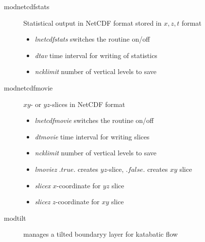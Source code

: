 \documentclass[a4paper,10pt]{article}
\begin{document}
\begin{description}
\begin{itemize}
\end{itemize}
\item [modnetcdfstats] Statistical output in NetCDF format stored in $x,z,t$ format
\begin{itemize}
\item \textit{lnetcdfstats}    switches the routine on/off
\item \textit{dtav}            time interval for writing of statistics
\item \textit{ncklimit}        number of vertical levels to save
\end{itemize}

\item [modnetcdfmovie] $xy$- or $yz$-slices in NetCDF format
\begin{itemize}
\item \textit{lnetcdfmovie}    switches the routine on/off
\item \textit{dtmovie}         time interval for writing slices
\item \textit{ncklimit}        number of vertical levels to save
\item \textit{lmoviez}         $.true.$ creates $yz$-slice, $.false.$ creates $xy$ slice
\item \textit{slicex}          $x$-coordinate for $yz$ slice
\item \textit{slicez}          $z$-coordinate for $xy$ slice
\end{itemize}

\item [modtilt] manages a tilted boundaryy layer for katabatic flow
\end{description}
\end{document}
